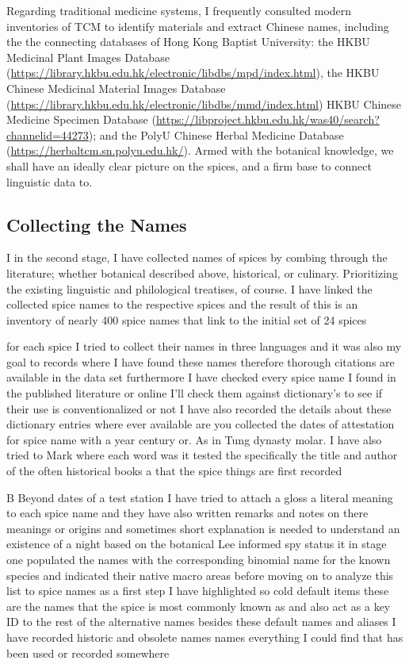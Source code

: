 Regarding traditional medicine systems, I frequently consulted modern inventories of \gls{TCM} to identify materials and extract Chinese names, including the the connecting databases of Hong Kong Baptist University: the HKBU Medicinal Plant Images Database (\url{https://library.hkbu.edu.hk/electronic/libdbs/mpd/index.html}), the HKBU Chinese Medicinal Material Images Database (\url{https://library.hkbu.edu.hk/electronic/libdbs/mmd/index.html}) HKBU Chinese Medicine Specimen Database (\url{https://libproject.hkbu.edu.hk/was40/search?channelid=44273}); and the PolyU Chinese Herbal Medicine Database (\url{https://herbaltcm.sn.polyu.edu.hk/}). Armed with the botanical knowledge, we shall have an ideally clear picture on the spices, and a firm base to connect linguistic data to.


\subsection{Collecting the Names}

I in the second stage, I have collected names of spices by combing through the literature; whether botanical described above, historical, or culinary. Prioritizing the existing linguistic and philological treatises, of course. I have linked the collected spice names to the respective spices and the result of this is an inventory of nearly 400 spice names that link to the initial set of 24 spices
  
    for each spice I tried to collect their names in three languages and it was also my goal to records where I have found these names therefore thorough citations are available in the data set furthermore I have checked every spice name I found in the published literature or online I'll check them against dictionary's to see if their use is conventionalized or not   I have also recorded the details about these dictionary entries where ever available are you collected the dates of attestation for spice name with a year century or. As in Tung dynasty molar. I have also tried to Mark where each word was it tested the specifically the title and author of the often historical books  a that the spice things are first recorded 

 B Beyond dates of a test station I have tried to attach a gloss a literal meaning to each spice name and they have also written remarks and notes on there meanings or origins and sometimes short explanation is needed to understand an existence of a night based on the botanical Lee informed spy status it in stage one populated the names with the corresponding   binomial name for the known species and indicated their native macro areas before moving on to analyze this list to spice names as a first step I have highlighted so cold default items these are the names that the spice is most commonly known as and also act as a key ID   to the rest of the alternative names besides these default names and aliases I have recorded historic and obsolete names names everything I could find that has been used or recorded somewhere 
 
